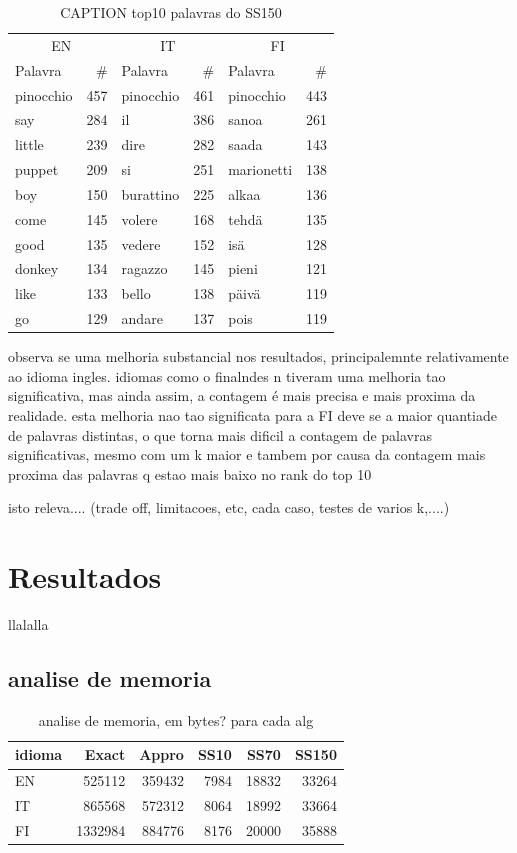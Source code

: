 \documentclass[mirror, portugues]{revdetua}
\begin{document}
\begin{table}[H]
\centering
\caption{CAPTION top10 palavras do SS150}
\label{table:top10_ss150}
\begin{tabular}{lr|lr|lr}
\toprule
\multicolumn{2}{c}{EN} & \multicolumn{2}{c}{IT} & \multicolumn{2}{c}{FI} \\
Palavra & \# & Palavra & \# & Palavra & \# \\
\midrule
pinocchio & 457 & pinocchio & 461 & pinocchio & 443 \\
say & 284 & il & 386 & sanoa & 261 \\
little & 239 & dire & 282 & saada & 143 \\
puppet & 209 & si & 251 & marionetti & 138 \\
boy & 150 & burattino & 225 & alkaa & 136 \\
come & 145 & volere & 168 & tehdä & 135 \\
good & 135 & vedere & 152 & isä & 128 \\
donkey & 134 & ragazzo & 145 & pieni & 121 \\
like & 133 & bello & 138 & päivä & 119 \\
go & 129 & andare & 137 & pois & 119 \\
\bottomrule
\end{tabular}
\end{table}

observa se uma melhoria substancial nos resultados, principalemnte relativamente ao idioma ingles. idiomas como o finalndes n tiveram uma melhoria tao significativa, mas ainda assim, a contagem é mais precisa e mais proxima da realidade. esta melhoria nao tao significata para a FI deve se a maior quantiade de palavras distintas, o que torna mais dificil a contagem de palavras significativas, mesmo com um k maior e tambem por causa da contagem mais proxima das palavras q estao mais baixo no rank do top 10

isto releva.... (trade off, limitacoes, etc, cada caso, testes de varios k,....)


\section{Resultados}

llalalla

\subsection{analise de memoria}

\begin{table}[H]
\centering
\caption{analise de memoria, em bytes? para cada alg}
\label{table:memoria}
\begin{tabular}{lrrrrr}
\toprule
idioma & Exact & Appro & SS10 & SS70 & SS150 \\
\midrule
EN & 525112 & 359432 & 7984 & 18832 & 33264 \\
IT & 865568 & 572312 & 8064 & 18992 & 33664 \\
FI &1332984 & 884776 & 8176 & 20000 & 35888 \\
\bottomrule
\end{tabular}
\end{table}
\end{document}
